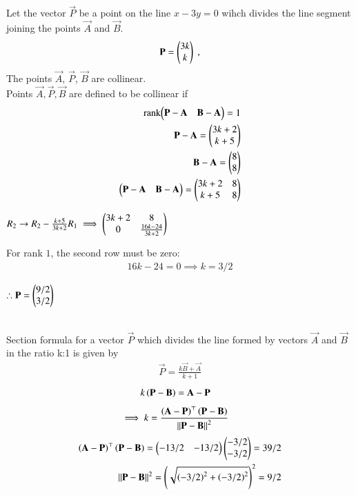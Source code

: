 \documentclass[journal]{IEEEtran}
\begin{document}
Let the vector $\vec{P}$ be a point on the line $x - 3y = 0$ wihch divides the line segment joining the points $\vec{A}$ and $\vec{B}$.
\begin{align}
    \vec{P}=\begin{myvec}{3k\\k}\end{myvec} \;, 
\end{align}
The points $\vec{A}$, $\vec{P}$, $\vec{B}$ are collinear.\\
Points $\vec{A}, \vec{P}, \vec{B}$ are defined to be collinear if 
		\begin{align}
			\text{rank}{\ensuremath{\begin{pmatrix}\mathbf{P}-\mathbf{A}& \mathbf{B}-\mathbf{A}\end{pmatrix}}} = 1\\
            \mathbf{P}-\mathbf{A} = \begin{pmatrix}3k+2\\k+5\end{pmatrix}\\
            \mathbf{B}-\mathbf{A} = \begin{pmatrix}8\\8\end{pmatrix}\\
            \begin{pmatrix}\mathbf{P}-\mathbf{A}& \mathbf{B}-\mathbf{A}\end{pmatrix} = \begin{pmatrix}3k+2 & 8\\k+5 & 8\end{pmatrix}
		\end{align}
\begin{center}
$R_2 \rightarrow R_2 - \frac{k+5}{3k+2}R_1 \implies \begin{pmatrix}3k+2 & 8\\0 & \frac{16k-24}{3k+2}\end{pmatrix}$
\end{center}
For rank $1$, the second row must be zero:
\begin{align}
    16k-24=0 \implies k=3/2
\end{align}
\begin{center}
$\therefore \vec{P}=\begin{myvec}{9/2\\3/2}\end{myvec}$
\end{center}
\\
Section formula for a vector $\vec{P}$ which divides the line formed by vectors $\vec{A}$ and $\vec{B}$ in the ratio k:1 is given by
\begin{align}
    \vec{P}=\frac{k\vec{B}+\vec{A}}{k+1}
\end{align}
\begin{align}
			k\left(\mathbf{P}-\mathbf{B}\right)&= \mathbf{A}-\mathbf{P}
\end{align}
\begin{align}
    \implies k &=
			\frac{\left(\mathbf{A}-\mathbf{P}\right)^{\top}\left(\mathbf{P}-\mathbf{B}\right)}{\left\lVert\mathbf{P}-\mathbf{B}\right\rVert^2}
\end{align}
\bigskip
\begin{align}
\left(\mathbf{A}-\mathbf{P}\right)^{\top}\left(\mathbf{P}-\mathbf{B}\right) = \begin{pmatrix}-13/2 & -13/2\end{pmatrix}\begin{pmatrix}-3/2\\-3/2\end{pmatrix} = 39/2\\
{\left\lVert\mathbf{P}-\mathbf{B}\right\rVert^2} = \left(\sqrt{\left(-3/2\right)^2 + \left(-3/2\right)^2}\right)^2 = 9/2
\end{align}
\end{document}
